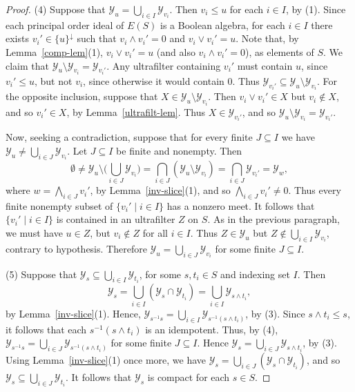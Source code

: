 \documentclass[a4paper,reqno,12pt]{amsart}
\numberwithin{equation}{section}
\theoremstyle{plain}
\theoremstyle{definition}
\begin{document}
\begin{proof}
\smallskip

(4) Suppose that $\mathcal{Y}_{u} = \bigcup_{i\in I} \mathcal{Y}_{v_i}$. Then $v_i \leq u$ for each $i \in I$, by (1). Since each principal order ideal of $E(S)$ is a Boolean algebra, for each $i \in I$ there exists $v_i' \in \{u\}^{\downarrow}$ such that $v_i \land v_i' = 0$ and $v_i \lor v_i' = u$. Note that, by Lemma~\ref{comp-lem}(1), $v_i \lor v_i' = u$ (and also $v_i \land v_i' = 0$), as elements of $S$. We claim that $\mathcal{Y}_{u} \setminus \mathcal{Y}_{v_i} = \mathcal{Y}_{v_i'}$. Any ultrafilter containing ${v_i'}$ must contain $u$, since $v_i' \leq u$, but not $v_i$, since otherwise it would contain $0$. Thus $\mathcal{Y}_{v_i'} \subseteq \mathcal{Y}_{u} \setminus \mathcal{Y}_{v_i}$. For the opposite inclusion, suppose that $X \in \mathcal{Y}_{u} \setminus \mathcal{Y}_{v_i}$. Then $v_i \lor v_i' \in X$ but $v_i \notin X$, and so $v_i' \in X$, by Lemma~\ref{ultrafilt-lem}. Thus $X \in \mathcal{Y}_{v_i'}$, and so $\mathcal{Y}_{u} \setminus \mathcal{Y}_{v_i} = \mathcal{Y}_{v_i'}$.

Now, seeking a contradiction, suppose that for every finite $J \subseteq I$ we have $\mathcal{Y}_{u} \neq \bigcup_{i\in J} \mathcal{Y}_{v_i}$. Let $J \subseteq I$ be finite and nonempty. Then 
\[\emptyset \neq \mathcal{Y}_{u} \setminus \bigg(\bigcup_{i\in J}\mathcal{Y}_{v_i}\bigg) = \bigcap_{i\in J} (\mathcal{Y}_{u} \setminus \mathcal{Y}_{v_i}) = \bigcap_{i\in J} \mathcal{Y}_{v_i'} = \mathcal{Y}_{w},\]
where $w = \bigwedge_{i\in J} v_i'$, by Lemma~\ref{inv-slice}(1), and so $\bigwedge_{i\in J} v_i' \neq 0$. Thus every finite nonempty subset of $\{v_i' \mid i \in I\}$ has a nonzero meet. It follows that $\{v_i' \mid i \in I\}$ is contained in an ultrafilter $Z$ on $S$. As in the previous paragraph, we must have $u \in Z$, but $v_i \notin Z$ for all $i \in I$. Thus $Z \in \mathcal{Y}_{u}$ but $Z \notin \bigcup_{i\in I} \mathcal{Y}_{v_i}$, contrary to hypothesis. Therefore $\mathcal{Y}_{u} = \bigcup_{i\in J} \mathcal{Y}_{v_i}$ for some finite $J \subseteq I$. 

\smallskip

(5) Suppose that $\mathcal{Y}_{s} \subseteq \bigcup_{i\in I} \mathcal{Y}_{t_i}$, for some $s, t_i \in S$ and indexing set $I$. Then 
\[\mathcal{Y}_{s} = \bigcup_{i\in I} (\mathcal{Y}_{s} \cap \mathcal{Y}_{t_i}) = \bigcup_{i\in I} \mathcal{Y}_{s \land t_i},\] 
by Lemma~\ref{inv-slice}(1). Hence, $\mathcal{Y}_{s^{-1}s} = \bigcup_{i\in I} \mathcal{Y}_{s^{-1}(s \land t_i)}$, by (3). Since $s \land t_i \leq s$, it follows that each $s^{-1}(s \land t_i)$ is an idempotent. Thus, by (4), $\mathcal{Y}_{s^{-1}s} = \bigcup_{i\in J} \mathcal{Y}_{s^{-1}(s \land t_i)}$ for some finite $J \subseteq I$. Hence $\mathcal{Y}_{s} = \bigcup_{i\in J} \mathcal{Y}_{s \land t_i}$, by (3). Using Lemma~\ref{inv-slice}(1) once more, we have $\mathcal{Y}_{s} = \bigcup_{i\in J} (\mathcal{Y}_{s} \cap \mathcal{Y}_{t_i})$, and so $\mathcal{Y}_{s} \subseteq \bigcup_{i\in J} \mathcal{Y}_{t_i}$. It follows that $\mathcal{Y}_{s}$ is compact for each $s \in S$.


\end{proof}
\end{document}
